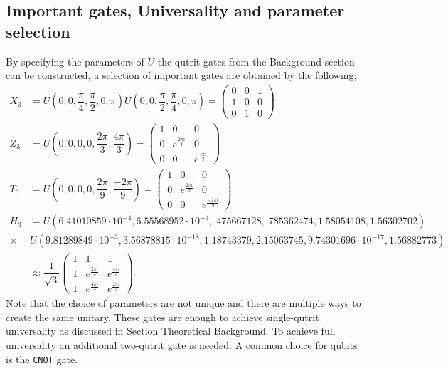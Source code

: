 \subsection{Important gates, Universality and parameter selection}
By specifying the parameters of $U$ the qutrit gates from the Background section can be constructed, a selection of important gates are obtained by the following;
\begin{equation}
\begin{aligned}
X_3 &= U(0,0,\dfrac{\pi}{4},\dfrac{\pi}{2},0,\pi)U(0,0,\dfrac{\pi}{2},\dfrac{\pi}{4},0,\pi) 
= \begin{pmatrix}
0&0&1
\\
1&0&0
\\
0&1&0
\end{pmatrix}
\\ 
Z_3 &= U(0,0,0,0,\dfrac{2\pi}{3},\dfrac{4\pi}{3})
= \begin{pmatrix}
1&0&0
\\
0&e^{\frac{2\pi i}{3}}&0
\\
0&0&e^{\frac{4\pi i}{3}}
\end{pmatrix}
\\
T_3 &= U(0,0,0,0,\dfrac{2\pi}{9},\dfrac{-2\pi}{9})
= \begin{pmatrix}
1&0&0
\\
0&e^{\frac{2\pi i}{9}}&0
\\
0&0&e^{\frac{-2\pi i}{9}}
\end{pmatrix}
\\
H_3 &= U(6.41010859\cdot 10^{-4}, 6.55568952\cdot 10^{-4}, .475667128, .785362474, 1.58054108, 1.56302702)\\ \times &U(9.81289849\cdot 10^{-3}, 3.56878815\cdot 10^{-18},1.18743379, 2.15063745, 9.74301696\cdot 10^{-17}, 1.56882773)\\
&\approx \dfrac{1}{\sqrt{3}}\begin{pmatrix}
1&1&1
\\
1&e^{\frac{2\pi i}{3}}&e^{\frac{4\pi i}{3}}
\\
1&e^{\frac{4\pi i}{3}}&e^{\frac{2\pi i}{3}}
\end{pmatrix}.
\end{aligned}
\end{equation}
Note that the choice of parameters are not unique and there are multiple ways to create the same unitary. These gates are enough to achieve single-qutrit universality as discussed in Section Theoretical Background. To achieve full universality an additional two-qutrit gate is needed. A common choice for qubits is the {\tt CNOT} gate\cite{qudit}.

